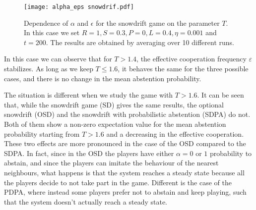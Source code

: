 \documentclass[12pt,oneside,a4paper,fleqn]{article}
\begin{document}
\begin{figure}[H]
    \centering
    \texttt{[image: alpha\_eps snowdrif.pdf]}
    \caption{Dependence of $\alpha$ and $\epsilon$ for the snowdrift game on the parameter $T$. In this case we set $R = 1, S = 0.3, P = 0, L = 0.4, \eta = 0.001$ and $t = 200$. The results are obtained by averaging over 10 different runs.}
    \label{fig: epsilon and alpha snodrift}
\end{figure}

In this case we can observe that for $T > 1.4$, the effective cooperation frequency $\varepsilon$ stabilizes.
As long as we keep $T \leq 1.6$, it behaves the same for the three possible cases, and there is no change in the mean abstention probability.

The situation is different when we study the game with $T > 1.6$.
It can be seen that, while the snowdrift game (SD) gives the same results, the optional snowdrift (OSD) and the snowdrift with probabilistic abstention (SDPA) do not.
Both of them show a non-zero expectation value for the mean abstention probability starting from $T > 1.6$ and a decreasing in the effective cooperation. \\
These two effects are more pronounced in the case of the OSD compared to the SDPA.
In fact, since in the OSD the players have either $\alpha = 0$ or $1$ probability to abstain, and since the players can imitate the behaviour of the nearest neighbours, what happens is that the system reaches a steady state because all the players decide to not take part in the game.
Different is the case of the PDPA, where instead some players prefer not to abstain and keep playing, such that the system doesn't actually reach a steady state. 
\end{document}

